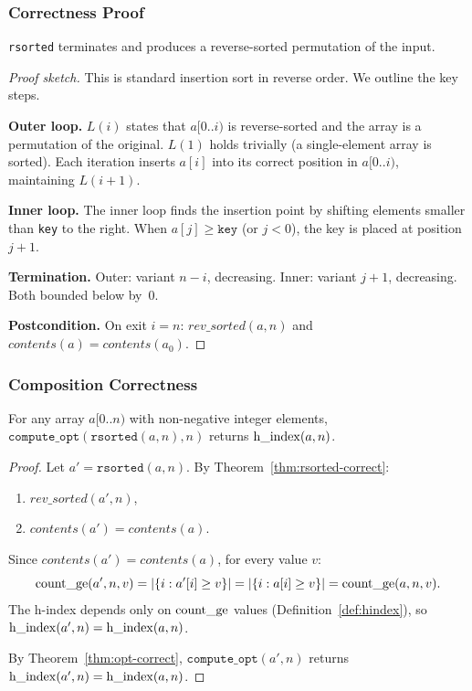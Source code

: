 \subsubsection{Correctness Proof}

\begin{theorem}\label{thm:rsorted-correct}
\texttt{rsorted} terminates and produces a reverse-sorted permutation of the input.
\end{theorem}

\begin{proof}[Proof sketch]
This is standard insertion sort in reverse order. We outline the key steps.

\textbf{Outer loop.} $L(i)$ states that $a[0..i)$ is reverse-sorted and the array
is a permutation of the original. $L(1)$ holds trivially (a single-element array is sorted).
Each iteration inserts $a[i]$ into its correct position in $a[0..i)$, maintaining
$L(i{+}1)$.

\textbf{Inner loop.} The inner loop finds the insertion point by shifting elements
smaller than \texttt{key} to the right. When $a[j] \geq \texttt{key}$ (or $j < 0$),
the key is placed at position $j+1$.

\textbf{Termination.} Outer: variant $n - i$, decreasing. Inner: variant $j + 1$, decreasing.
Both bounded below by~0.

\textbf{Postcondition.} On exit $i = n$: $\mathit{rev\_sorted}(a, n)$ and
$\mathit{contents}(a) = \mathit{contents}(a_0)$.
\end{proof}

\subsubsection{Composition Correctness}

\begin{theorem}[Composition]\label{thm:composition}
For any array $a[0..n)$ with non-negative integer elements,
$\texttt{compute\_opt}(\texttt{rsorted}(a, n), n)$ returns $\operatorname{h\_index}(a, n)$.
\end{theorem}

\begin{proof}
Let $a' = \texttt{rsorted}(a, n)$. By Theorem~\ref{thm:rsorted-correct}:
\begin{enumerate}
  \item $\mathit{rev\_sorted}(a', n)$,
  \item $\mathit{contents}(a') = \mathit{contents}(a)$.
\end{enumerate}

Since $\mathit{contents}(a') = \mathit{contents}(a)$, for every value $v$:
\[
  \operatorname{count\_ge}(a', n, v)
  = |\{i : a'[i] \geq v\}|
  = |\{i : a[i] \geq v\}|
  = \operatorname{count\_ge}(a, n, v).
\]
The h-index depends only on $\operatorname{count\_ge}$ values (Definition~\ref{def:hindex}),
so $\operatorname{h\_index}(a', n) = \operatorname{h\_index}(a, n)$.

By Theorem~\ref{thm:opt-correct}, $\texttt{compute\_opt}(a', n)$ returns
$\operatorname{h\_index}(a', n) = \operatorname{h\_index}(a, n)$.
\end{proof}

